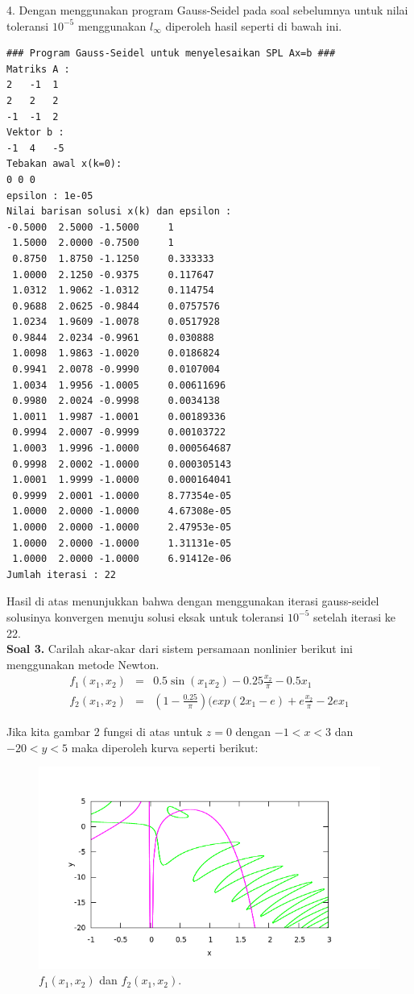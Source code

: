 \documentclass[paper=a4, fontsize=11pt]{scrartcl}
\numberwithin{equation}{section} %
\numberwithin{figure}{section} %
\numberwithin{table}{section} %
\begin{document}
4. Dengan menggunakan program Gauss-Seidel pada soal sebelumnya untuk nilai toleransi $10^{-5}$ menggunakan $l_{\infty}$ diperoleh hasil seperti di bawah ini.
\begin{small}
\begin{verbatim}
### Program Gauss-Seidel untuk menyelesaikan SPL Ax=b ###
Matriks A : 
2	-1	1	
2	2	2	
-1	-1	2	
Vektor b : 
-1	4	-5	
Tebakan awal x(k=0): 
0 0 0 
epsilon : 1e-05
Nilai barisan solusi x(k) dan epsilon : 
-0.5000  2.5000 -1.5000 	1
 1.5000  2.0000 -0.7500 	1
 0.8750  1.8750 -1.1250 	0.333333
 1.0000  2.1250 -0.9375 	0.117647
 1.0312  1.9062 -1.0312 	0.114754
 0.9688  2.0625 -0.9844 	0.0757576
 1.0234  1.9609 -1.0078 	0.0517928
 0.9844  2.0234 -0.9961 	0.030888
 1.0098  1.9863 -1.0020 	0.0186824
 0.9941  2.0078 -0.9990 	0.0107004
 1.0034  1.9956 -1.0005 	0.00611696
 0.9980  2.0024 -0.9998 	0.0034138
 1.0011  1.9987 -1.0001 	0.00189336
 0.9994  2.0007 -0.9999 	0.00103722
 1.0003  1.9996 -1.0000 	0.000564687
 0.9998  2.0002 -1.0000 	0.000305143
 1.0001  1.9999 -1.0000 	0.000164041
 0.9999  2.0001 -1.0000 	8.77354e-05
 1.0000  2.0000 -1.0000 	4.67308e-05
 1.0000  2.0000 -1.0000 	2.47953e-05
 1.0000  2.0000 -1.0000 	1.31131e-05
 1.0000  2.0000 -1.0000 	6.91412e-06
Jumlah iterasi : 22
\end{verbatim}
\end{small}
Hasil di atas menunjukkan bahwa dengan menggunakan iterasi gauss-seidel solusinya konvergen menuju solusi eksak untuk toleransi $10^{-5}$ setelah iterasi ke 22.\\

\vspace{1cm}
\large \textbf{Soal 3.}
Carilah akar-akar dari sistem persamaan nonlinier berikut ini menggunakan metode Newton.\\
\begin{eqnarray}
f_{1}(x_{1}, x_{2}) &=& 0.5\sin(x_{1}x_{2}) - 0.25\frac{x_{2}}{\pi} - 0.5x_{1}\\
f_{2}(x_{1}, x_{2}) &=& (1-\frac{0.25}{\pi})(exp(2x_{1} - e) + e\frac{x_{2}}{\pi} - 2ex_{1}
\end{eqnarray}

Jika kita gambar 2 fungsi di atas untuk $z=0$ dengan $ -1<x<3 $ dan $ -20<y<5 $ maka diperoleh kurva seperti berikut:

\begin{figure}
	\centering
	\includegraphics[width=1.0\textwidth]
		{plot3.png}
	\caption{$f_{1}(x_{1}, x_{2})$ dan $f_{2}(x_{1}, x_{2})$.}
	\label{fig:plot3}
\end{figure}
\end{document}

